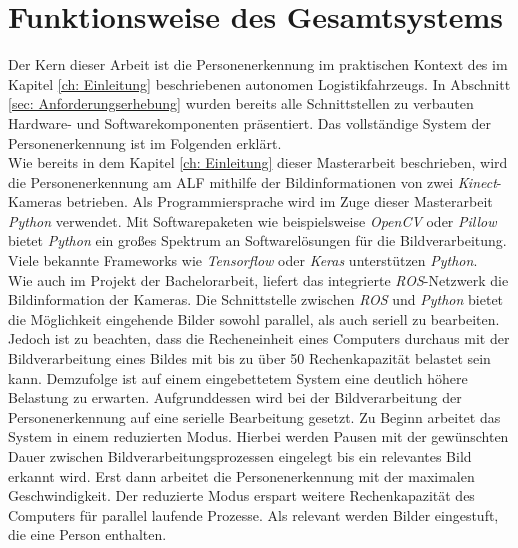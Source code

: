 	
	 
	
	\section{Funktionsweise des Gesamtsystems}
	\label{sec: Funktionsweise des Gesamtsystems}
		
	Der Kern dieser Arbeit ist die Personenerkennung im praktischen Kontext des im Kapitel \ref{ch: Einleitung} beschriebenen autonomen Logistikfahrzeugs. In Abschnitt \ref{sec: Anforderungserhebung} wurden bereits alle Schnittstellen zu verbauten Hardware- und Softwarekomponenten präsentiert. Das vollständige System der Personenerkennung ist im Folgenden erklärt.\\
	
	Wie bereits in dem Kapitel \ref{ch: Einleitung} dieser Masterarbeit beschrieben, wird die Personenerkennung am ALF mithilfe der Bildinformationen von zwei \textit{Kinect}-Kameras betrieben. Als Programmiersprache wird im Zuge dieser Masterarbeit \textit{Python} verwendet. Mit Softwarepaketen wie beispielsweise \textit{OpenCV} oder \textit{Pillow} bietet \textit{Python} ein großes Spektrum an Softwarelösungen für die Bildverarbeitung. Viele bekannte Frameworks wie \textit{Tensorflow} oder \textit{Keras} unterstützen \textit{Python}.\\
	
	Wie auch im Projekt der Bachelorarbeit, liefert das integrierte \textit{ROS}-Netzwerk die Bildinformation der Kameras. Die Schnittstelle zwischen \textit{ROS} und \textit{Python} bietet die Möglichkeit eingehende Bilder sowohl parallel, als auch seriell zu bearbeiten. Jedoch ist zu beachten, dass die Recheneinheit eines Computers durchaus mit der Bildverarbeitung eines Bildes mit bis zu über 50 \percent\text{ } Rechenkapazität belastet sein kann. Demzufolge ist auf einem eingebettetem System eine deutlich höhere Belastung zu erwarten. Aufgrunddessen wird bei der Bildverarbeitung der Personenerkennung auf eine serielle Bearbeitung gesetzt. Zu Beginn arbeitet das System in einem reduzierten Modus. Hierbei werden Pausen mit der gewünschten Dauer zwischen Bildverarbeitungsprozessen eingelegt bis ein relevantes Bild erkannt wird. Erst dann arbeitet die Personenerkennung mit der maximalen Geschwindigkeit. Der reduzierte Modus erspart weitere Rechenkapazität des Computers für parallel laufende Prozesse. Als relevant werden Bilder eingestuft, die eine Person enthalten.\\
	

